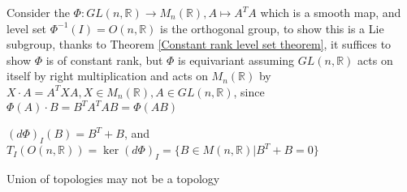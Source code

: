 \documentclass[main]{subfiles}
\begin{document}
\begin{example}
Consider the $\Phi:GL(n,\mathbb R)\to M_n(\mathbb R),A\mapsto A^TA$ which is a smooth map, and level set $\Phi^{-1}(I)=O(n,\mathbb R)$ is the orthogonal group, to show this is a Lie subgroup, thanks to Theorem \ref{Constant rank level set theorem}, it suffices to show $\Phi$ is of constant rank, but $\Phi$ is equivariant assuming $GL(n,\mathbb R)$ acts on itself by right multiplication and acts on $M_n(\mathbb R)$ by $X\cdot A=A^TXA,X\in M_n(\mathbb R),A\in GL(n,\mathbb R)$, since $\Phi(A)\cdot B=B^TA^TAB=\Phi(AB)$ \par
$(d\Phi)_I(B)=B^T+B$, and $T_I(O(n,\mathbb R))=\ker(d\Phi)_I=\{B\in M(n,\mathbb R)|B^T+B=0\}$
\end{example}

\begin{example}
Union of topologies may not be a topology
\end{example}
\end{document}
